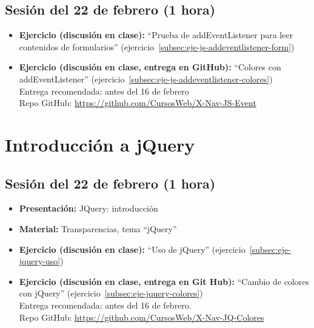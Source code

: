 \documentclass[a4paper,12pt]{report}
\begin{document}
\subsection{Sesión del 22 de febrero (1 hora)}

\begin{itemize}
\item \textbf{Ejercicio (discusión en clase):} ``Prueba de addEventListener para leer contenidos de formularios'' (ejercicio~\ref{subsec:eje-js-addeventlistener-form})
\item \textbf{Ejercicio (discusión en clase, entrega en GitHub):} ``Colores con addEventListener'' (ejercicio~\ref{subsec:eje-js-addeventlistener-colores}) \\
  Entrega recomendada: antes del 16 de febrero \\
  Repo GitHub: \url{https://github.com/CursosWeb/X-Nav-JS-Event} \\
\end{itemize}


\section{Introducción a jQuery}


\subsection{Sesión del 22 de febrero (1 hora)}

\begin{itemize}
\item \textbf{Presentación:} JQuery: introducción
\item \textbf{Material:} Transparencias, tema ``jQuery''
\item \textbf{Ejercicio (discusión en clase):} ``Uso de jQuery'' (ejercicio~\ref{subsec:eje-jquery-uso})
\item \textbf{Ejercicio (discusión en clase, entrega en Git Hub):} ``Cambio de colores con jQuery'' (ejercicio~\ref{subsec:eje-jquery-colores}) \\
  Entrega recomendada: antes del 16 de febrero.  \\
  Repo GitHub: \url{https://github.com/CursosWeb/X-Nav-JQ-Colores} \\
\end{itemize}
\end{document}
